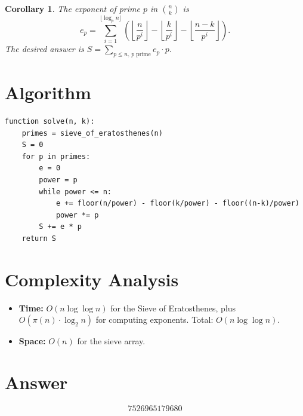 \documentclass[12pt]{article}
\newtheorem{corollary}[theorem]{Corollary}
\begin{document}
\begin{corollary}
The exponent of prime $p$ in $\binom{n}{k}$ is
\[
e_p = \sum_{i=1}^{\lfloor \log_p n \rfloor} \left( \left\lfloor \frac{n}{p^i} \right\rfloor - \left\lfloor \frac{k}{p^i} \right\rfloor - \left\lfloor \frac{n-k}{p^i} \right\rfloor \right).
\]
The desired answer is $S = \sum_{p \leq n,\, p\text{ prime}} e_p \cdot p$.
\end{corollary}

\section{Algorithm}

\begin{verbatim}
function solve(n, k):
    primes = sieve_of_eratosthenes(n)
    S = 0
    for p in primes:
        e = 0
        power = p
        while power <= n:
            e += floor(n/power) - floor(k/power) - floor((n-k)/power)
            power *= p
        S += e * p
    return S
\end{verbatim}

\section{Complexity Analysis}
\begin{itemize}
    \item \textbf{Time:} $O(n \log \log n)$ for the Sieve of Eratosthenes, plus $O(\pi(n) \cdot \log_2 n)$ for computing exponents. Total: $O(n \log \log n)$.
    \item \textbf{Space:} $O(n)$ for the sieve array.
\end{itemize}

\section{Answer}

\[
\boxed{7526965179680}
\]
\end{document}

